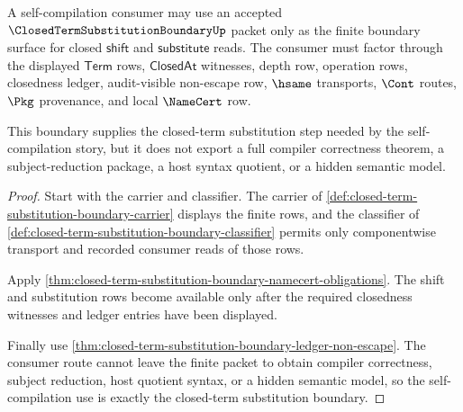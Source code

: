 \begin{theorem}
\label{thm:closed-term-substitution-boundary-consumer-boundary}
A self-compilation consumer may use an accepted $\ClosedTermSubstitutionBoundaryUp$ packet only as the finite boundary surface for closed $\mathsf{shift}$ and $\mathsf{substitute}$ reads. The consumer must factor through the displayed $\mathsf{Term}$ rows, $\mathsf{ClosedAt}$ witnesses, depth row, operation rows, closedness ledger, audit-visible non-escape row, $\hsame$ transports, $\Cont$ routes, $\Pkg$ provenance, and local $\NameCert$ row.

This boundary supplies the closed-term substitution step needed by the self-compilation story, but it does not export a full compiler correctness theorem, a subject-reduction package, a host syntax quotient, or a hidden semantic model.
\end{theorem}
\begin{proof}
Start with the carrier and classifier. The carrier of \autoref{def:closed-term-substitution-boundary-carrier} displays the finite rows, and the classifier of \autoref{def:closed-term-substitution-boundary-classifier} permits only componentwise transport and recorded consumer reads of those rows.

Apply \autoref{thm:closed-term-substitution-boundary-namecert-obligations}. The shift and substitution rows become available only after the required closedness witnesses and ledger entries have been displayed.

Finally use \autoref{thm:closed-term-substitution-boundary-ledger-non-escape}. The consumer route cannot leave the finite packet to obtain compiler correctness, subject reduction, host quotient syntax, or a hidden semantic model, so the self-compilation use is exactly the closed-term substitution boundary.
\end{proof}

